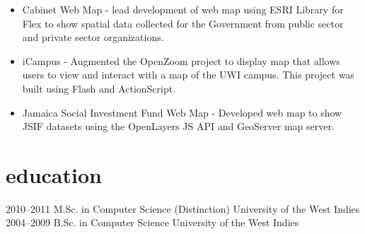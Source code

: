 \documentclass[]{cv-style}          %
\begin{document}
\begin{entrylist}
{\begin{itemize}
\item Cabinet Web Map - lead development of web map using ESRI Library for Flex to show spatial data collected for the Government from public sector and private sector organizations.
\item iCampus - Augmented the OpenZoom project to display map that allows users to view and interact with a map of the UWI campus. This project was built using Flash and ActionScript.
\item Jamaica Social Investment Fund Web Map - Developed web map to show JSIF datasets using the OpenLayers JS API and GeoServer map server. 
\end{itemize}
}
\end{entrylist}


\section{education}

\begin{entrylist}
\entry
{2010--2011}
{M.Sc. {\normalfont in Computer Science (Distinction)}}
{University of the West Indies}
{\vspace{-0.3cm}}
\entry
{2004--2009}
{B.Sc. {\normalfont in Computer Science}}
{University of the West Indies}
{}
\end{entrylist}



\end{document}
